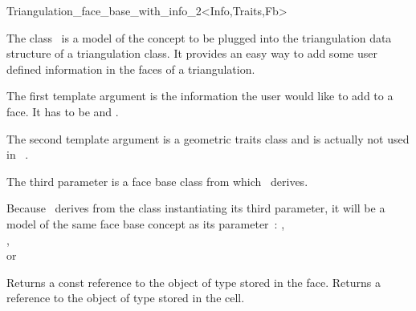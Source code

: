 

\begin{ccRefClass}{Triangulation_face_base_with_info_2<Info,Traits,Fb>} 



\ccDefinition
  
The class \ccRefName\ is a model of the concept
 to be plugged into the
triangulation data structure of a triangulation class.
It provides an easy way to add some user defined information
in the faces of a triangulation.


\ccParameters

The first template argument is the information the user would like to add
to a face.  It has to be  and .

The second template argument is a geometric traits class
and  is actually not used in \ccRefName\ .

The third parameter is a face base class from which
\ccRefName\ derives. 

\ccInheritsFrom {}

\ccIsModel
Because \ccRefName\ derives from the class instantiating its third
parameter, it will be a model of the same face base concept
as its parameter~:
,\\
 ,\\
or 


\ccTypes
{}


\ccAccessFunctions
{}
\ccTagFullDeclarations

{Returns a const reference to the object of type  stored in the face.}
\ccGlue
{}
{Returns a reference to the object of type  stored in the cell.}

\ccSeeAlso
{} \\
 \\


\end{ccRefClass}


